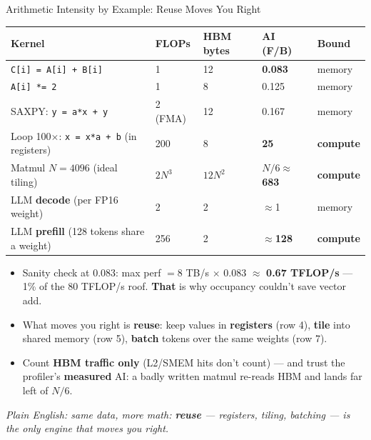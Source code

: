 \documentclass[aspectratio=169]{beamer}
\newcommand{\kw}[1]{\textbf{\textcolor{kwblue}{#1}}}
\newcommand{\pe}[1]{\par{\setlength{\fboxsep}{2.5pt}\noindent\colorbox{navy!9}{\parbox{\dimexpr\textwidth-5pt\relax}{\footnotesize\itshape Plain English: #1}}}}
\begin{document}
\begin{frame}{Arithmetic Intensity by Example: Reuse Moves You Right}
  \begingroup\footnotesize\setlength{\tabcolsep}{3pt}\renewcommand{\arraystretch}{1.12}
  \begin{tabular}{@{}lllll@{}}
    \toprule
    \textbf{Kernel} & \textbf{FLOPs} & \textbf{HBM bytes} & \textbf{AI (F/B)} & \textbf{Bound} \\
    \midrule
    \texttt{C[i] = A[i] + B[i]} & 1 & 12 & \kw{0.083} & memory \\
    \texttt{A[i] *= 2} & 1 & 8 & 0.125 & memory \\
    SAXPY: \texttt{y = a*x + y} & 2 (FMA) & 12 & 0.167 & memory \\
    Loop 100$\times$: \texttt{x = x*a + b} (in registers) & 200 & 8 & \kw{25} & \kw{compute} \\
    Matmul $N{=}4096$ (ideal tiling) & $2N^3$ & $12N^2$ & $N/6 \approx$ \kw{683} & \kw{compute} \\
    LLM \kw{decode} (per FP16 weight) & 2 & 2 & $\approx$1 & memory \\
    LLM \kw{prefill} (128 tokens share a weight) & 256 & 2 & $\approx$\kw{128} & \kw{compute} \\
    \bottomrule
  \end{tabular}\endgroup
  \medskip
  \begin{itemize}\footnotesize
    \item Sanity check at 0.083: max perf $= 8$ TB/s $\times$ 0.083 $\approx$ \kw{0.67 TFLOP/s} ---
          1\% of the 80 TFLOP/s roof. \kw{That} is why occupancy couldn't save vector add.
    \item What moves you right is \kw{reuse}: keep values in \kw{registers} (row 4),
          \kw{tile} into shared memory (row 5), \kw{batch} tokens over the same weights (row 7).
    \item Count \kw{HBM traffic only} (L2/SMEM hits don't count) --- and trust the profiler's
          \kw{measured} AI: a badly written matmul re-reads HBM and lands far left of $N/6$.
  \end{itemize}
  \pe{same data, more math: \kw{reuse} --- registers, tiling, batching --- is the only engine that moves you right.}
\end{frame}
\end{document}
